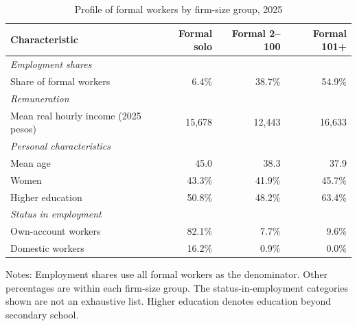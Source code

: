\begin{table}[htbp]
  \centering
  \caption{Profile of formal workers by firm-size group, 2025}
  \label{tab:formal-worker-profile-2025}
  \small
  \begin{tabular}{lrrr}
    \toprule
    Characteristic & Formal solo & Formal 2--100 & Formal 101+ \\
    \midrule
    \multicolumn{4}{l}{\textit{Employment shares}} \\
    Share of formal workers & 6.4\% & 38.7\% & 54.9\% \\
    \midrule
    \multicolumn{4}{l}{\textit{Remuneration}} \\
    Mean real hourly income (2025 pesos) & 15,678 & 12,443 & 16,633 \\
    \midrule
    \multicolumn{4}{l}{\textit{Personal characteristics}} \\
    Mean age & 45.0 & 38.3 & 37.9 \\
    Women & 43.3\% & 41.9\% & 45.7\% \\
    Higher education & 50.8\% & 48.2\% & 63.4\% \\
    \midrule
    \multicolumn{4}{l}{\textit{Status in employment}} \\
    Own-account workers & 82.1\% & 7.7\% & 9.6\% \\
    Domestic workers & 16.2\% & 0.9\% & 0.0\% \\
    \bottomrule
  \end{tabular}
  \vspace{0.3em}
  \begin{minipage}{0.95\textwidth}
  \footnotesize
  Notes: Employment shares use all formal workers as the denominator. Other percentages are within each firm-size group. The status-in-employment categories shown are not an exhaustive list. Higher education denotes education beyond secondary school.
  \end{minipage}
\end{table}
